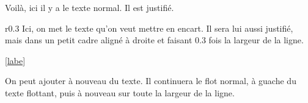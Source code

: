 \documentclass[12pt]{article}
\begin{document}
Voilà, ici il y a le texte normal. Il est justifié.
\begin{wrapfigure}{r}{0.3\textwidth}
Ici, on met le texte qu'on veut mettre en encart.
Il sera lui aussi justifié, mais dans un petit cadre
aligné à droite et faisant 0.3 fois la largeur de la ligne.
\end{wrapfigure}

\label{labello}
\ref{labe}


On peut ajouter à nouveau du texte.
Il continuera le flot normal, à guache du texte flottant,
puis à nouveau sur toute la largeur de la ligne.
\end{document}
